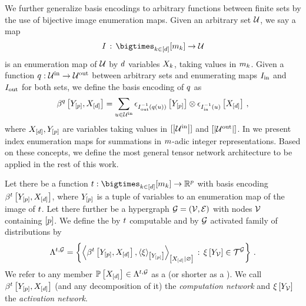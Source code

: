 We further generalize basis encodings to arbitrary functions between finite sets by the use of bijective image enumeration maps.
Given an arbitrary set $\mathcal{U}$, we say a map
\begin{align*}
    \indexinterpretation \defcols
    \bigtimes_{\catenumeratorin}[\catdimof{\catenumerator}] \rightarrow \arbset
\end{align*}
is an enumeration map of $\mathcal{U}$ by $d$ variables $X_{k}$, taking values in $m_{k}$.
Given a function $q:\mathcal{U}^{\mathrm{in}}\rightarrow\mathcal{U}^{\mathrm{out}}$ between arbitrary sets and enumerating maps $I_{\mathrm{in}}$ and $I_{\mathrm{out}}$ for both sets, we define the basis encoding of $q$ as
\begin{align*}
    \bencodingofat{\exfunction}{\headvariables,\shortcatvariables}
    = \sum_{\arbelement\in\inset} \onehotmapofat{\invindexinterpretationofat{\outsymbol}{\exfunction(\arbelement)}}{\headvariables}
    \otimes \onehotmapofat{\invindexinterpretationofat{\insymbol}{\arbelement}}{\shortcatvariables} \, ,
\end{align*}
where $X_{[d]},Y_{[p]}$ are variables taking values in $[\left|\mathcal{U}^{\mathrm{in}}\right|]$ and $[\left|\mathcal{U}^{\mathrm{out}}\right|]$.
In  we present index enumeration maps for summations in $m$-adic integer representations.
%
Based on these concepts, we define the most general tensor network architecture to be applied in the rest of this work.

\begin{definition}[\ComputationActivationNetwork{} (\CompActNets{})]
    \label{def:compActNets}
    Let there be a function $\sstat : \facstates \allowbreak \rightarrow \parspace$ with basis encoding $\bencodingofat{\sstat}{\headvariables,\shortcatvariables}$, where $Y_{[p]}$ is a tuple of variables to an enumeration map of the image of $t$.
    Let there further be a hypergraph $\mathcal{G}=(\mathcal{V},\mathcal{E})$ with nodes $\mathcal{V}$ containing $[p]$.
    We define the by $t$ computable and by $\mathcal{G}$ activated family of distributions by
    \begin{align*}
        \realizabledistsof{\sstat,\graph}
        = \left\{ \normalizationof{\bencodingofat{\sstat}{\headvariables,\shortcatvariables},\contractionof{\acttensor}{\headvariables} %
        }{\shortcatvariables}
              \wcols \acttensorat{\headvariableof{\nodes}} \in \tnsetof{\graph} \right\} \, .
    \end{align*}
    We refer to any member $\mathbb{P}\left[X_{[d]}\right]\in\Lambda^{t,\mathcal{G}}$ as a \emph{\ComputationActivationNetwork{}} (or shorter as a \emph{\CompActNet{}}).
    We call $\beta^{t}\left[Y_{[p]},X_{[d]}\right]$ (and any decomposition of it) the \emph{computation network} and $\xi\left[Y_{\mathcal{V}}\right]$ the \emph{activation network}.
\end{definition}

